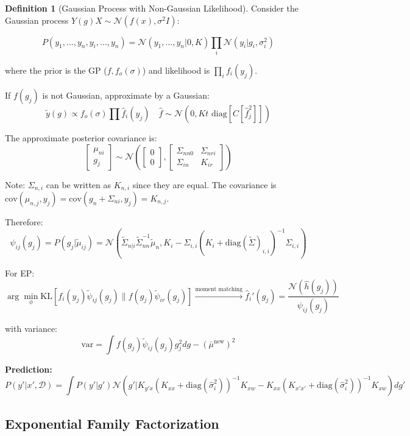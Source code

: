 \documentclass[12pt,a4paper]{article}
\theoremstyle{definition}
\newtheorem{definition}{Definition}[section]
\begin{document}
\begin{definition}[Gaussian Process with Non-Gaussian Likelihood]
Consider the Gaussian process $Y(g) X \sim \mathcal{N}(f(x), \sigma^2 I)$:

\[
P(y_1, \ldots, y_n, y_i, \ldots, y_n) = \mathcal{N}(y_1, \ldots, y_n | 0, K) \prod_i \mathcal{N}(y_i | g_i, \sigma_i^2)
\]

where the prior is the GP ($f, f_o(\sigma)$) and likelihood is $\prod_i f_i(y_j)$.

If $f(g_j)$ is not Gaussian, approximate by a Gaussian:
\[
\tilde{y}(g) \propto f_o(\sigma) \prod \hat{f}_i(y_j) \quad \hat{f} \sim \mathcal{N}(0, K t \text{ diag}[C[\hat{f}_j^2]])
\]

The approximate posterior covariance is:
\[
\begin{bmatrix} \mu_{ni} \\ g_j \end{bmatrix} \sim \mathcal{N} \left( \begin{bmatrix} 0 \\ 0 \end{bmatrix}, \begin{bmatrix} \Sigma_{nn0} & \Sigma_{nri} \\ \Sigma_{in} & K_{ir} \end{bmatrix} \right)
\]

Note: $\Sigma_{n,i}$ can be written as $K_{n,i}$ since they are equal. The covariance is $\text{cov}(\mu_{n,j}, y_j) = \text{cov}(g_n + \Sigma_{ni}, y_j) = K_{n,j}$.

Therefore:
\[
\psi_{ij}(g_j) = P(g_j | \tilde{\mu}_{ij}) = \mathcal{N}(\tilde{\Sigma}_{n|i} \tilde{\Sigma}_{nn}^{-1} \tilde{\mu}_{n}, K_i - \Sigma_{i,i}(K_i + \text{diag}(\tilde{\Sigma})_{i,i})^{-1} \Sigma_{i,i})
\]

For EP:
\[
\arg\min_\phi \text{KL}[f_i(y_j) \tilde{\psi}_{ij}(g_j) \| f(g_j) \tilde{\psi}_{ir}(g_j)] \xrightarrow{\text{moment matching}} \hat{f}_i'(g_j) = \frac{\mathcal{N}(\hat{h}(g_j))}{\psi_{ij}(g_j)}
\]

with variance:
\[
\text{var} = \int f(g_j) \tilde{\psi}_{ij}(g_j) g_j^2 dg - (\bar{\mu}^{\text{new}})^2
\]

\textbf{Prediction:}
\[
P(y'|x', \mathcal{D}) = \int P(y'|g') \mathcal{N}(g' | K_{y'x}(K_{xx} + \text{diag}(\hat{\sigma}_i^2))^{-1} K_{xw} - K_{xx}(K_{x'x'} + \text{diag}(\hat{\sigma}_i^2))^{-1} K_{xw}) dg'
\]
\end{definition}

\subsection{Exponential Family Factorization}
\end{document}

